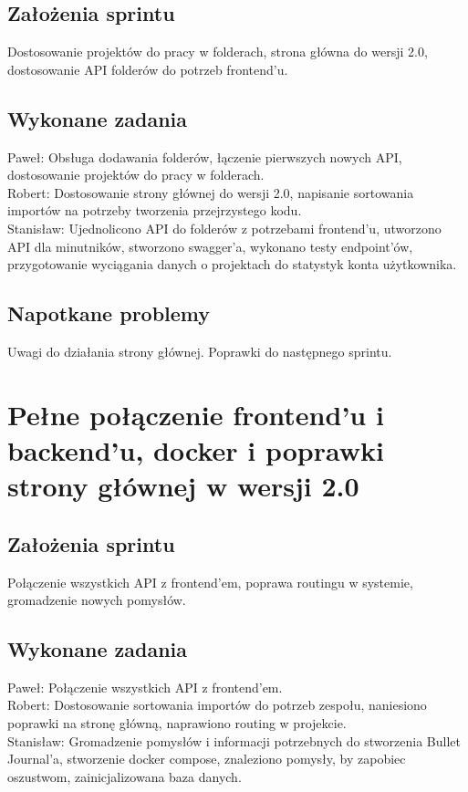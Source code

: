 \documentclass[a4paper,11pt]{report}
\begin{document}
\subsection {Założenia sprintu}
Dostosowanie projektów do pracy w folderach, strona główna do wersji 2.0, dostosowanie API folderów do potrzeb frontend'u.
\subsection {Wykonane zadania}
Paweł: Obsługa dodawania folderów, łączenie pierwszych nowych API, dostosowanie projektów do pracy w folderach.\\ 
Robert: Dostosowanie strony głównej do wersji 2.0, napisanie sortowania importów na potrzeby tworzenia przejrzystego kodu.\\
Stanisław: Ujednolicono API do folderów z potrzebami frontend'u, utworzono API dla minutników, stworzono swagger'a, wykonano testy endpoint'ów, przygotowanie wyciągania danych o projektach do statystyk konta użytkownika.\\  
\subsection {Napotkane problemy}
Uwagi do działania strony głównej. Poprawki do następnego sprintu.

\section {Pełne połączenie frontend'u i backend'u, docker i poprawki strony głównej w wersji 2.0}
\subsection {Założenia sprintu}
Połączenie wszystkich API z frontend'em, poprawa routingu w systemie, gromadzenie nowych pomysłów.
\subsection {Wykonane zadania}
Paweł: Połączenie wszystkich API z frontend'em.\\
Robert:  Dostosowanie sortowania importów do potrzeb zespołu, naniesiono poprawki na stronę główną, naprawiono routing w projekcie.\\ 
Stanisław: Gromadzenie pomysłów i informacji potrzebnych do stworzenia Bullet Journal'a, stworzenie docker compose, znaleziono pomysły, by zapobiec oszustwom, zainicjalizowana baza danych.\\ 
\end{document}
